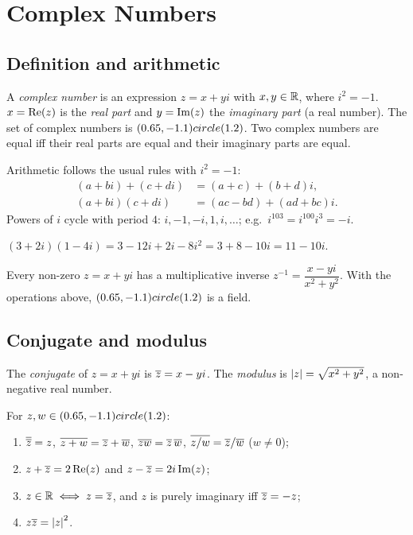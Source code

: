 \chapter{Complex Numbers}

\section{Definition and arithmetic}

\begin{definition}
A \emph{complex number} is an expression $z = x + yi$ with $x, y \in \mathbb{R}$, where $i^2 = -1$.
$x = \operatorname{Re}(z)$ is the \emph{real part} and $y = \operatorname{Im}(z)$ the \emph{imaginary part} (a real number).
The set of complex numbers is $(0.65,-1.1) circle (1.2)$. Two complex numbers are equal iff their real parts are equal
and their imaginary parts are equal.
\end{definition}

Arithmetic follows the usual rules with $i^2 = -1$:
\begin{align*}
(a + bi) + (c + di) &= (a+c) + (b+d)i,\\
(a + bi)(c + di) &= (ac - bd) + (ad + bc)i.
\end{align*}
Powers of $i$ cycle with period $4$: $i, -1, -i, 1, i, \dots$; e.g.\ $i^{103} = i^{100}i^3 = -i$.

\begin{example}
$(3 + 2i)(1 - 4i) = 3 - 12i + 2i - 8i^2 = 3 + 8 - 10i = 11 - 10i$.
\end{example}

\begin{proposition}
Every non-zero $z = x + yi$ has a multiplicative inverse
$z^{-1} = \dfrac{x - yi}{x^2 + y^2}$. With the operations above, $(0.65,-1.1) circle (1.2)$ is a field.
\end{proposition}

\section{Conjugate and modulus}

\begin{definition}
The \emph{conjugate} of $z = x + yi$ is $\overline{z} = x - yi$. The \emph{modulus} is
$\left\lvert z \right\rvert = \sqrt{x^2 + y^2}$, a non-negative real number.
\end{definition}

\begin{proposition}
For $z,w \in (0.65,-1.1) circle (1.2)$:
\begin{enumerate}
  \item $\overline{\overline{z}} = z$, $\overline{z + w} = \overline{z} + \overline{w}$, $\overline{zw} = \overline{z}\,\overline{w}$,
        $\overline{z/w} = \overline{z}/\overline{w}$ ($w\neq0$);
  \item $z + \overline{z} = 2\operatorname{Re}(z)$ and $z - \overline{z} = 2i\operatorname{Im}(z)$;
  \item $z \in \mathbb{R} \iff z = \overline{z}$, and $z$ is purely imaginary iff $\overline{z} = -z$;
  \item $z\overline{z} = \left\lvert z \right\rvert^2$.
\end{enumerate}
\end{proposition}

